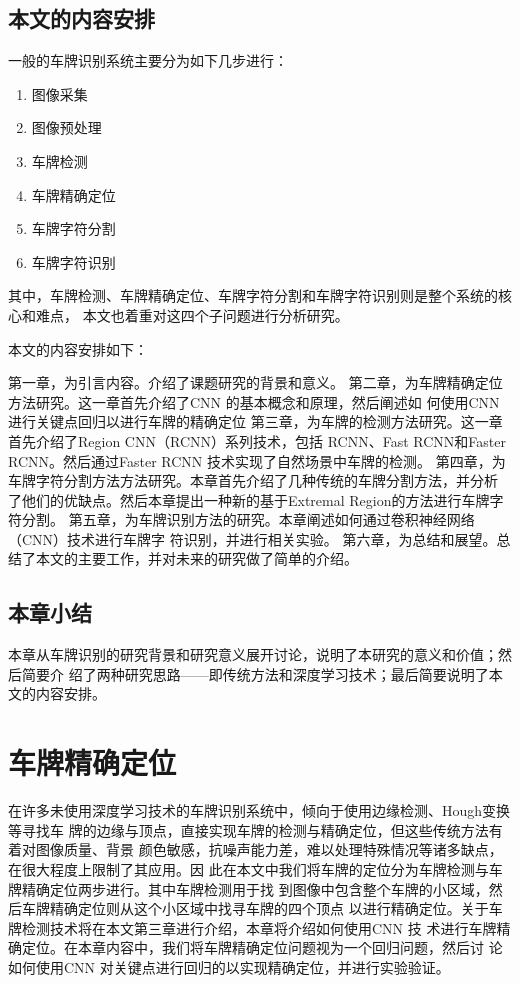 \section{本文的内容安排}

一般的车牌识别系统主要分为如下几步进行：

\begin{enumerate}
\item 图像采集
\item 图像预处理
\item 车牌检测
\item 车牌精确定位
\item 车牌字符分割
\item 车牌字符识别
\end{enumerate}

其中，车牌检测、车牌精确定位、车牌字符分割和车牌字符识别则是整个系统的核心和难点，
本文也着重对这四个子问题进行分析研究。

本文的内容安排如下：

第一章，为引言内容。介绍了课题研究的背景和意义。
第二章，为车牌精确定位方法研究。这一章首先介绍了CNN 的基本概念和原理，然后阐述如
何使用CNN 进行关键点回归以进行车牌的精确定位
第三章，为车牌的检测方法研究。这一章首先介绍了Region CNN（RCNN）系列技术，包括
RCNN、Fast RCNN和Faster RCNN。然后通过Faster RCNN 技术实现了自然场景中车牌的检测。
第四章，为车牌字符分割方法方法研究。本章首先介绍了几种传统的车牌分割方法，并分析
了他们的优缺点。然后本章提出一种新的基于Extremal Region的方法进行车牌字符分割。
第五章，为车牌识别方法的研究。本章阐述如何通过卷积神经网络（CNN）技术进行车牌字
符识别，并进行相关实验。
第六章，为总结和展望。总结了本文的主要工作，并对未来的研究做了简单的介绍。

\section{本章小结}
本章从车牌识别的研究背景和研究意义展开讨论，说明了本研究的意义和价值；然后简要介
绍了两种研究思路——即传统方法和深度学习技术；最后简要说明了本文的内容安排。

\chapter{车牌精确定位}

在许多未使用深度学习技术的车牌识别系统中，倾向于使用边缘检测、Hough变换等寻找车
牌的边缘与顶点，直接实现车牌的检测与精确定位，但这些传统方法有着对图像质量、背景
颜色敏感，抗噪声能力差，难以处理特殊情况等诸多缺点，在很大程度上限制了其应用。因
此在本文中我们将车牌的定位分为车牌检测与车牌精确定位两步进行。其中车牌检测用于找
到图像中包含整个车牌的小区域，然后车牌精确定位则从这个小区域中找寻车牌的四个顶点
以进行精确定位。关于车牌检测技术将在本文第三章进行介绍，本章将介绍如何使用CNN 技
术进行车牌精确定位。在本章内容中，我们将车牌精确定位问题视为一个回归问题，然后讨
论如何使用CNN 对关键点进行回归的以实现精确定位，并进行实验验证。

